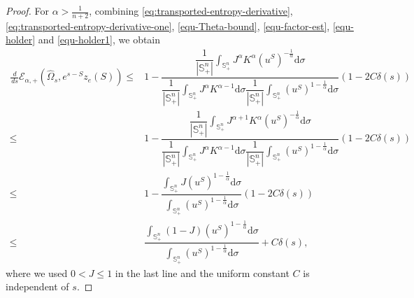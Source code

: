 \documentclass[11pt, reqno]{amsart}
\theoremstyle{remark}
\theoremstyle{definition}
\numberwithin{equation}{section}
\newcommand{\dd}{\,d}
\begin{document}
\begin{proof}
For $\alpha>\frac{1}{n+2}$, combining \eqref{eq:transported-entropy-derivative}, \eqref{eq:transported-entropy-derivative-one}, \eqref{equ-Theta-bound}, \eqref{equ-factor-est}, \eqref{equ-holder} and \eqref{equ-holder1}, we obtain
\begin{align}
    \frac{\dd}{\dd s}\mathcal{E}_{\alpha,+}(\widehat\Omega_s,e^{s-S}z_e(S)) \leq & 1- \dfrac{\dfrac{1}{|\mathbb{S}_+^n|}\displaystyle\int_{\mathbb{S}_+^n}J^{\alpha}K^{\alpha}(u^S)^{-\frac{1}{\alpha}}\mathrm{d}\sigma}{\dfrac{1}{|\mathbb{S}_+^n|}\displaystyle\int_{\mathbb{S}_+^n}J^{\alpha}K^{\alpha-1}\mathrm{d}\sigma\dfrac{1}{|\mathbb{S}_+^n|}\int_{\mathbb{S}_+^n}(u^S)^{1-\frac{1}{\alpha}}\mathrm{d}\sigma}(1-2C\delta(s)) \nonumber\\
    \leq & 1- \dfrac{\dfrac{1}{|\mathbb{S}_+^n|}\displaystyle\int_{\mathbb{S}_+^n}J^{\alpha+1}K^{\alpha}(u^S)^{-\frac{1}{\alpha}}\mathrm{d}\sigma}{\dfrac{1}{|\mathbb{S}_+^n|}\displaystyle\int_{\mathbb{S}_+^n}J^{\alpha}K^{\alpha-1}\mathrm{d}\sigma\dfrac{1}{|\mathbb{S}_+^n|}\int_{\mathbb{S}_+^n}(u^S)^{1-\frac{1}{\alpha}}\mathrm{d}\sigma}(1-2C\delta(s)) \nonumber\\
    \leq & 1 - \dfrac{\displaystyle\int_{\mathbb{S}_+^n}J (u^S)^{1-\frac{1}{\alpha}}\mathrm{d}\sigma}{\displaystyle\int_{\mathbb{S}_+^n} (u^S)^{1-\frac{1}{\alpha}}\mathrm{d}\sigma} (1-2C\delta(s))   \nonumber\\
    \leq & \dfrac{\displaystyle\int_{\mathbb{S}_+^n} (1-J)(u^S)^{1-\frac{1}{\alpha}}\mathrm{d}\sigma}{\displaystyle\int_{\mathbb{S}_+^n} (u^S)^{1-\frac{1}{\alpha}}\mathrm{d}\sigma} + C\delta(s),  \label{equ-dsentropy}
\end{align}
where we used $0<J\leq 1$ in the last line and the uniform constant $C$ is independent of $s$.


\end{proof}
\end{document}
